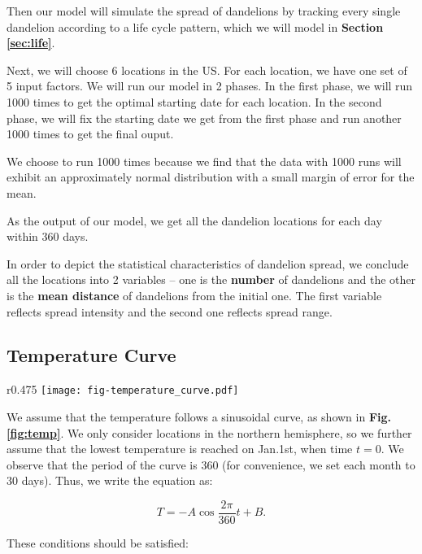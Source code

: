 \documentclass[12pt]{article}
\begin{document}
		\vspace{-0.5cm}
		Then our model will simulate the spread of dandelions by tracking every single dandelion according to a life cycle pattern, which we will model in \textbf{Section \ref{sec:life}}.  
		
		Next, we will choose 6 locations in the US.  For each location, we have one set of 5 input factors. We will run our model in 2 phases.  In the first phase, we will run 1000 times to get the optimal starting date for each location.  In the second phase, we will fix the starting date we get from the first phase and run another 1000 times to get the final ouput.
		
		We choose to run 1000 times because we find that the data with 1000 runs will exhibit an approximately normal distribution with a small margin of error for the mean.

		As the output of our model, we get all the dandelion locations for each day within 360 days.  
		
		In order to depict the statistical characteristics of dandelion spread, we conclude all the locations into 2 variables -- one is the \textbf{number} of dandelions and the other is the \textbf{mean distance} of dandelions from the initial one.  The first variable reflects spread intensity and the second one reflects spread range.


	
	\subsection{Temperature Curve}
	\label{sec:temp}
	
		\begin{wrapfigure}{r}{0.475\textwidth}
			\vspace{-0.4cm}
			\centering
			\texttt{[image: fig-temperature\_curve.pdf]}
			\caption{Temperature curve}
			\label{fig:temp}
		\end{wrapfigure}
		
		We assume that the temperature follows a sinusoidal curve, as shown in \textbf{Fig.\ref{fig:temp}}.  We only consider locations in the northern hemisphere, so we further assume that the lowest temperature is reached on Jan.1st, when time $t = 0$.  We observe that the period of the curve is 360 (for convenience, we set each month to 30 days).  Thus, we write the equation as:
		
		\[
			T = -A \cos{\frac{2\pi}{360} t} + B.
		\]
		
		These conditions should be satisfied:
		
\end{document}
